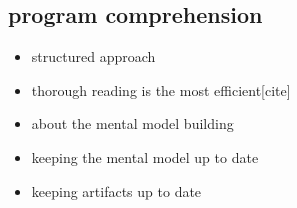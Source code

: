 \subsection{program comprehension}

\begin{itemize}
\item structured approach
\item thorough reading is the most efficient[cite]
\item about the mental model building
\item keeping the mental model up to date
\item keeping artifacts up to date
\end{itemize}


